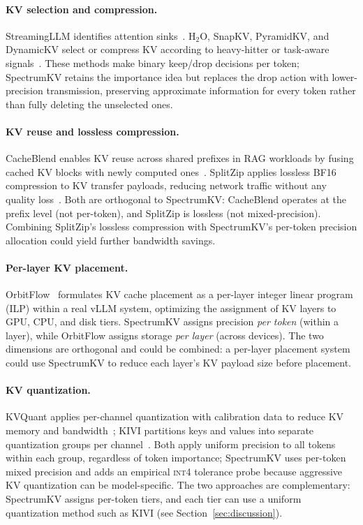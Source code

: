 \documentclass[11pt]{article}
\newcommand{\method}{SpectrumKV}
\newcommand{\intiv}{\textsc{int4}}
\theoremstyle{plain}
\theoremstyle{definition}
\begin{document}
\paragraph{KV selection and compression.}
StreamingLLM identifies attention sinks~\citep{streamingllm}.  H$_2$O, SnapKV, PyramidKV, and DynamicKV select or compress KV according to heavy-hitter or task-aware signals~\citep{h2o,snapkv,pyramidkv,dynamickv}.  These methods make binary keep/drop decisions per token; \method{} retains the importance idea but replaces the drop action with lower-precision transmission, preserving approximate information for every token rather than fully deleting the unselected ones.

\paragraph{KV reuse and lossless compression.}
CacheBlend enables KV reuse across shared prefixes in RAG workloads by fusing cached KV blocks with newly computed ones~\citep{cacheblend}.  SplitZip applies lossless BF16 compression to KV transfer payloads, reducing network traffic without any quality loss~\citep{splitzip}.  Both are orthogonal to \method{}: CacheBlend operates at the prefix level (not per-token), and SplitZip is lossless (not mixed-precision).  Combining SplitZip's lossless compression with \method{}'s per-token precision allocation could yield further bandwidth savings.

\paragraph{Per-layer KV placement.}
OrbitFlow~\citep{orbitflow} formulates KV cache placement as a per-layer integer linear program (ILP) within a real vLLM system, optimizing the assignment of KV layers to GPU, CPU, and disk tiers.  \method{} assigns precision \emph{per token} (within a layer), while OrbitFlow assigns storage \emph{per layer} (across devices).  The two dimensions are orthogonal and could be combined: a per-layer placement system could use \method{} to reduce each layer's KV payload size before placement.

\paragraph{KV quantization.}
KVQuant applies per-channel quantization with calibration data to reduce KV memory and bandwidth~\citep{kvquant}; KIVI partitions keys and values into separate quantization groups per channel~\citep{kivi}.  Both apply uniform precision to all tokens within each group, regardless of token importance; \method{} uses per-token mixed precision and adds an empirical \intiv{} tolerance probe because aggressive KV quantization can be model-specific.  The two approaches are complementary: \method{} assigns per-token tiers, and each tier can use a uniform quantization method such as KIVI (see Section~\ref{sec:discussion}).
\end{document}
